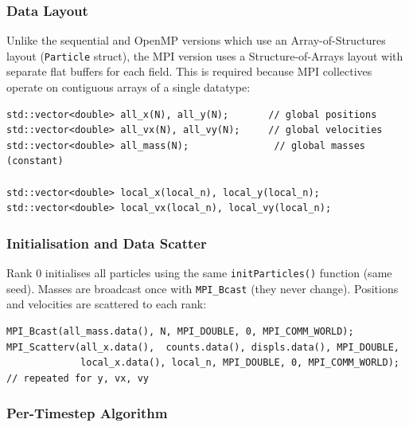 ﻿\documentclass[12pt,a4paper]{article}
\begin{document}
\subsubsection*{Data Layout}

Unlike the sequential and OpenMP versions which use an Array-of-Structures
layout (\texttt{Particle} struct), the MPI version uses a Structure-of-Arrays
layout with separate flat buffers for each field. This is required because MPI
collectives operate on contiguous arrays of a single datatype:

\begin{lstlisting}
std::vector<double> all_x(N), all_y(N);       // global positions
std::vector<double> all_vx(N), all_vy(N);     // global velocities
std::vector<double> all_mass(N);               // global masses (constant)

std::vector<double> local_x(local_n), local_y(local_n);
std::vector<double> local_vx(local_n), local_vy(local_n);
\end{lstlisting}

\subsubsection*{Initialisation and Data Scatter}

Rank 0 initialises all particles using the same \texttt{initParticles()}
function (same seed). Masses are broadcast once with \texttt{MPI\_Bcast}
(they never change). Positions and velocities are scattered to each rank:

\begin{lstlisting}
MPI_Bcast(all_mass.data(), N, MPI_DOUBLE, 0, MPI_COMM_WORLD);
MPI_Scatterv(all_x.data(),  counts.data(), displs.data(), MPI_DOUBLE,
             local_x.data(), local_n, MPI_DOUBLE, 0, MPI_COMM_WORLD);
// repeated for y, vx, vy
\end{lstlisting}

\subsubsection*{Per-Timestep Algorithm}
\end{document}
